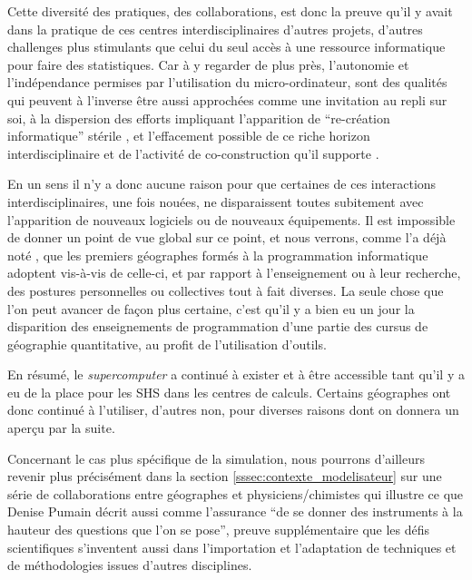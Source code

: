 Cette diversité des pratiques, des collaborations, est donc la preuve qu'il y avait dans la pratique de ces centres interdisciplinaires d'autres projets, d'autres challenges plus stimulants que celui du seul accès à une ressource informatique pour faire des statistiques. Car à y regarder de plus près, l'autonomie et l'indépendance permises par l'utilisation du micro-ordinateur, sont des qualités qui peuvent à l'inverse être aussi approchées comme une invitation au repli sur soi, à la dispersion des efforts impliquant l'apparition de \enquote{re-création informatique} stérile , et l'effacement possible de ce riche horizon interdisciplinaire et de l'activité de co-construction qu'il supporte \autocite{Banos2013}.

En un sens il n'y a donc aucune raison pour que certaines de ces interactions interdisciplinaires, une fois nouées, ne disparaissent toutes subitement avec l'apparition de nouveaux logiciels ou de nouveaux équipements. Il est impossible de donner un point de vue global sur ce point, et nous verrons, comme l'a déjà noté \autocite[372]{Cuyala2014}, que les premiers géographes formés à la programmation informatique adoptent vis-à-vis de celle-ci, et par rapport à l'enseignement ou à leur recherche, des postures personnelles ou collectives tout à fait diverses. La seule chose que l'on peut avancer de façon plus certaine, c'est qu'il y a bien eu un jour la disparition des enseignements de programmation d'une partie des cursus de géographie quantitative, au profit de l'utilisation d'outils.

En résumé, le \textit{supercomputer} a continué à exister et à être accessible tant qu'il y a eu de la place pour les SHS dans les centres de calculs. Certains géographes ont donc continué à l'utiliser, d'autres non, pour diverses raisons dont on donnera un aperçu par la suite.


Concernant le cas plus spécifique de la simulation, nous pourrons d'ailleurs revenir plus précisément dans la section \ref{sssec:contexte_modelisateur} sur une série de collaborations entre géographes et physiciens/chimistes qui illustre ce que Denise Pumain décrit aussi comme l'assurance \enquote{de se donner des instruments à la hauteur des questions que l'on se pose}, preuve supplémentaire que les défis scientifiques s'inventent aussi dans l'importation et l'adaptation de techniques et de méthodologies issues d'autres disciplines.


